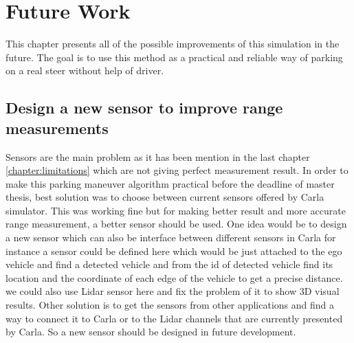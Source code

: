 \chapter{Future Work}\label{chapter: future_works}
This chapter presents all of the possible improvements of this simulation in the future. The goal is to use this method as a practical and reliable way of parking on a real steer without help of driver.
\section{Design a new sensor to improve range measurements}
Sensors are the main problem as it has been mention in the last chapter \ref{chapter:limitations} which are not giving perfect measurement result. In order to make this parking maneuver algorithm practical before the deadline of master thesis, best solution was to choose between current sensors offered by Carla simulator. This was working fine but for making better result and more accurate range measurement, a better sensor should be used. One idea would be to design a new sensor which can also be interface between different sensors in Carla for instance a sensor could be defined here which would be just attached to the ego vehicle and find a detected vehicle and from the id of detected vehicle find its location and the coordinate of each edge of the vehicle to get a precise distance.
we could also use Lidar sensor here and fix the problem of it to show 3D visual results. 
Other solution is to get the sensors from other applications and find a way to connect it to Carla or to the Lidar channels that are currently presented by Carla. So a new sensor should be designed in future development.
